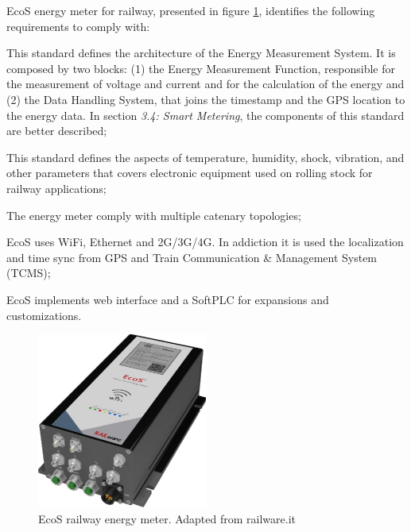 	EcoS energy meter for railway, presented in figure \ref{fig:ecos}, identifies the following requirements to comply with:
	
	\begin{description}
	\setlength\itemsep{-0em}
	
	\item [EN 50463 standard] This standard defines the architecture of the Energy Measurement System. It is composed by two blocks: (1) the Energy Measurement Function, responsible for the measurement of voltage and current and for the calculation of the energy and (2) the Data Handling System, that joins the timestamp and the GPS location to the energy data. In section \textit{3.4: Smart Metering}, the components of this standard are better described;
	
	\item [EN 50155 standard] This standard defines the aspects of temperature, humidity, shock, vibration, and other parameters that covers electronic equipment used on rolling stock for railway applications;
	
	\item [AC and DC measurement channels] The energy meter comply with multiple catenary topologies;
	
	\item [Multiple Connectivity] EcoS uses WiFi, Ethernet and 2G/3G/4G. In addiction it is used the localization and time sync from GPS and Train Communication \& Management System (TCMS);
	
	\item [Multiple access and customization] EcoS implements web interface and a SoftPLC for expansions and customizations.
	\end{description}


\begin{figure}[h!]
	\centering

		\includegraphics[width=0.5\textwidth,keepaspectratio]{figures/32.EnergyS/ecos}
		\caption{EcoS railway energy meter. Adapted from railware.it}
		\label{fig:ecos}
	
\end{figure}

